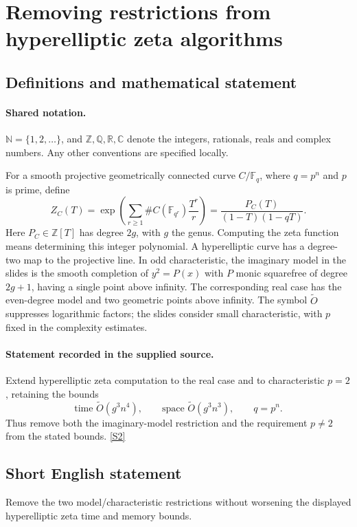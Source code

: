 \documentclass[11pt]{article}
\newcommand{\sref}[2]{\hyperlink{source:#1:#2}{[S#2]}}
\begin{document}
\section{Removing restrictions from hyperelliptic zeta algorithms}\label{statement}

\subsection{Definitions and mathematical statement}

\paragraph{Shared notation.}$\mathbb N=\{1,2,\ldots\}$, and $\mathbb Z,\mathbb Q,\mathbb R,\mathbb C$ denote the integers, rationals, reals and complex numbers. Any other conventions are specified locally.


For a smooth projective geometrically connected curve $C/\mathbb F_q$, where $q=p^n$ and $p$ is prime, define
\[
Z_C(T)=\exp\left(\sum_{r\ge1}\#C(\mathbb F_{q^r})\frac{T^r}{r}\right)=\frac{P_C(T)}{(1-T)(1-qT)}.
\]
Here $P_C\in\mathbb Z[T]$ has degree $2g$, with $g$ the genus. Computing the zeta function means determining this integer polynomial.
A hyperelliptic curve has a degree-two map to the projective line. In odd characteristic, the imaginary model in the slides is the smooth completion of $y^2=P(x)$ with $P$ monic squarefree of degree $2g+1$, having a single point above infinity. The corresponding real case has the even-degree model and two geometric points above infinity. The symbol $\widetilde O$ suppresses logarithmic factors; the slides consider small characteristic, with $p$ fixed in the complexity estimates.
\paragraph{Statement recorded in the supplied source.}
Extend hyperelliptic zeta computation to the real case and to characteristic $p=2$, retaining the bounds
\[
\text{time }\widetilde O(g^3n^4),\qquad \text{space }\widetilde O(g^3n^3),\qquad q=p^n.
\]
Thus remove both the imaginary-model restriction and the requirement $p\ne2$ from the stated bounds. \sref{statement}{2}

\subsection{Short English statement}
Remove the two model/characteristic restrictions without worsening the displayed hyperelliptic zeta time and memory bounds.
\end{document}

